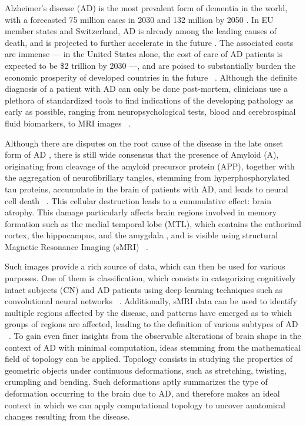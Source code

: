 \documentclass{article}
\begin{document}
Alzheimer's disease (AD) is the most prevalent form of dementia in the world, with a forecasted 75
million cases in 2030 and 132 million by 2050 \citep{world2017global}. In EU member states and
Switzerland, AD is already among the leading causes of death, and is projected to further accelerate
in the future \citep{sleeman2019escalating}. The associated costs are immense --- in the United
States alone, the cost of care of AD patients is expected to be \$2 trillion by 2030 ---, and are
poised to substantially burden the economic prosperity of developed countries in the future
~\citep{world2017global}. Although the definite diagnosis of a patient with AD can only be done
post-mortem, clinicians use a plethora of standardized tools to find indications of the developing
pathology as early as possible, ranging from neuropsychological tests, blood and cerebrospinal fluid
biomarkers, to MRI images ~\citep{mckhann2011diagnosis, lehmann2016biomarkers, smits2012early}.

Although there are disputes on the root cause of the disease in the late onset form of AD
\citep{hur2020innate, fulop2018can, tharp2013origins}, there is still wide consensus that the
presence of Amyloid \textbeta{} (A\textbeta{}), originating from cleavage of the amyloid precursor
protein (APP), together with the aggregation of neurofibrillary tangles, stemming from
hyperphosphorylated tau proteins, accumulate in the brain of patients with AD, and leads to neural
cell death ~\citep{da2016insights}. This cellular destruction leads to a cummulative effect: brain
atrophy. This damage particularly affects brain regions involved in memory formation such as the
medial temporal lobe (MTL), which contains the enthorinal cortex, the hippocampus, and the amygdala
\citep{goedert2006century}, and is visible using structural Magnetic Resonance Imaging (sMRI)
~\citep{frisoni2010clinical}.

Such images provide a rich source of data, which can then be used for various
purposes. One of them is classification, which consists in categorizing
cognitively intact subjects (CN) and AD patients using deep learning techniques
such as convolutional neural networks ~\citep{wen2020convolutional}.
Additionally, sMRI data can be used to identify multiple regions affected by the
disease, and patterns have emerged as to which groups of regions are affected,
leading to the definition of various subtypes of AD
~\citep{poulakis2018heterogeneous,tijms2020pathophysiological}. To gain even
finer insights from the observable alterations of brain shape in the context of
AD with minimal computation, ideas stemming from the mathematical field of
topology can be applied. Topology consists in studying the properties of
geometric objects under continuous deformations, such as stretching, twisting,
crumpling and bending. Such deformations aptly summarizes the type of
deformation occurring to the brain due to AD, and therefore makes an ideal
context in which we can apply computational topology to uncover anatomical
changes resulting from the disease.
\end{document}

